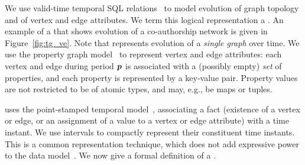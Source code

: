

%

We use valid-time temporal SQL
relations~\cite{DBLP:conf/vldb/BohlenSS96} to model evolution of graph
topology and of vertex and edge attributes.  We term this logical
representation a \tg.  An example of a \tg that shows evolution of a
co-authorship network is given in Figure~\ref{fig:tg_ve}.  Note that
\tg represents evolution of a {\em single graph} over time.
%
We use the property graph model~\cite{GraphDB} to represent vertex and
edge attributes: each vertex and edge during period $\boldsymbol{p}$ is associated
with a (possibly empty) {\em set} of properties, and each property is
represented by a key-value pair.  Property values are not restricted
to be of atomic types, and may, e.g., be maps or tuples.

\tg uses the point-stamped temporal
model~\cite{DBLP:reference/db/Toman09}, associating a fact (existence
of a vertex or edge, or an assignment of a value to a vertex or edge
attribute) with a time instant.  We use intervals to compactly
represent their constituent time instants.  This is a common
representation technique, which does not add expressive power to the
data model~\cite{DBLP:conf/ictl/Chomicki94}.  We now give a formal
definition of a \tg.

